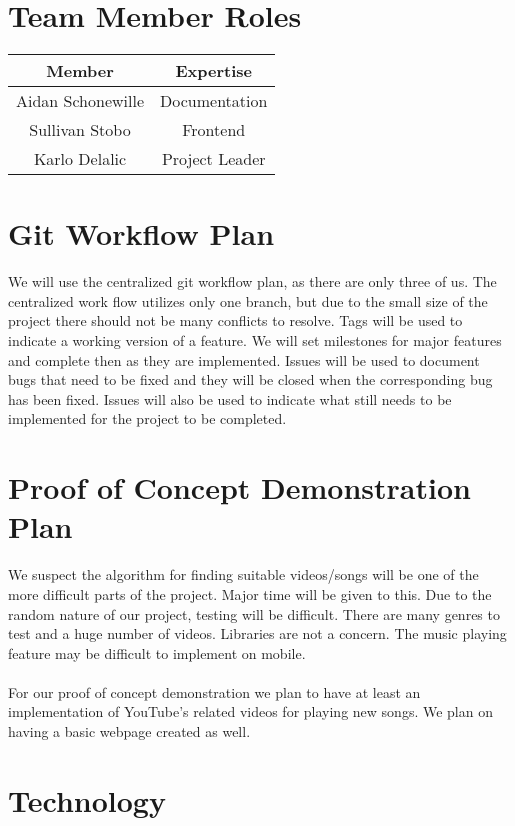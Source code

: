 \documentclass{article}
\begin{document}
\section{Team Member Roles}
\begin{tabular}{|c|c|}
\hline
Member&Expertise\\
\hline
Aidan Schonewille&Documentation\\
Sullivan Stobo&Frontend\\
Karlo Delalic&Project Leader\\
\hline
\end{tabular}
\section{Git Workflow Plan}

We will use the centralized git workflow plan, as there are only three of us. The centralized work flow utilizes only one branch, but due to the small size of the project there should \color{red}not \color{black}be many conflicts to resolve. Tags will be used to indicate a working version of a feature. We will set milestones for major features and complete then as they are implemented. \color{red}Issues will be used to document bugs that need to be fixed and they will be closed when the corresponding bug has been fixed. \color{black}Issues will also be used to indicate what still needs to be implemented for the project to be completed.


\newpage
\section{Proof of Concept Demonstration Plan}

We suspect the algorithm for finding suitable videos/songs will be one of the more difficult parts of the project. Major time will be given to this. Due to the random nature of our project, testing will be difficult. There are many genres to test and a huge number of videos. Libraries are not a concern. The music playing feature may be difficult to implement on mobile.
\\
\\
For our proof of concept demonstration we plan to have at least an implementation of YouTube’s related videos for playing new songs. We plan on having a basic webpage created as well.

\section{Technology}
\end{document}

